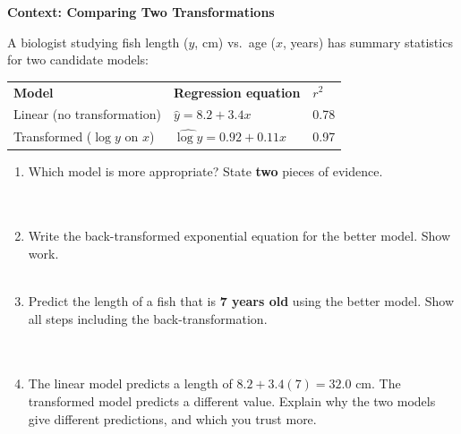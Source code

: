 \documentclass[10pt]{article}
\begin{document}
\vspace{0.12in}

\begin{tcolorbox}[colback=white, colframe=black!40, boxrule=0.8pt, arc=2mm,
    left=4mm, right=4mm, top=3mm, bottom=3mm,
    title={\textbf{Tier E --- Extension}}, fonttitle=\bfseries, halign title=center]
\small

\textbf{Context: Comparing Two Transformations}

A biologist studying fish length ($y$, cm) vs.\ age ($x$, years) has summary statistics for
two candidate models:

\vspace{6pt}
\renewcommand{\arraystretch}{1.4}
\begin{tabularx}{\linewidth}{@{} l X X @{}}
\rowcolor{sky} \textbf{Model} & \textbf{Regression equation} & \textbf{$r^2$} \\
Linear (no transformation) & $\hat{y} = 8.2 + 3.4x$ & 0.78 \\
Transformed ($\log y$ on $x$) & $\widehat{\log y} = 0.92 + 0.11x$ & 0.97 \\
\end{tabularx}

\vspace{10pt}

\begin{enumerate}[leftmargin=1.6em, itemsep=0.18in]

  \item Which model is more appropriate? State \textbf{two} pieces of evidence.\\[8pt]
        \writeline\\[3pt]\writeline\\[3pt]\writeline

  \item Write the back-transformed exponential equation for the better model. Show work.\\[8pt]
        \writeline\\[3pt]\writeline

  \item Predict the length of a fish that is \textbf{7 years old} using the better model.
        Show all steps including the back-transformation.\\[8pt]
        \writeline\\[3pt]\writeline\\[3pt]\writeline

  \item The linear model predicts a length of $8.2 + 3.4(7) = 32.0$ cm.
        The transformed model predicts a different value. Explain why the two models
        give different predictions, and which you trust more.\\[8pt]
        \writeline\\[3pt]\writeline\\[3pt]\writeline


\end{enumerate}
\end{tcolorbox}
\end{document}
